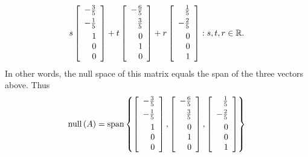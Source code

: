 \begin{solution}
\begin{equation*}
s \leftB 
\begin{array}{r}
-\vspace{0.05in}\frac{3}{5} \\ 
-\vspace{0.05in}\frac{1}{5} \\ 
1 \\ 
0 \\ 
0
\end{array}
\rightB + t \leftB 
\begin{array}{r}
-\vspace{0.05in}\frac{6}{5} \\ 
\vspace{0.05in}\frac{3}{5} \\ 
0 \\ 
1 \\ 
0
\end{array}
\rightB + r \leftB 
\begin{array}{r}
\vspace{0.05in}\frac{1}{5} \\ 
-\vspace{0.05in}\frac{2}{5} \\ 
0 \\ 
0 \\ 
1
\end{array}
\rightB :s , t , r\in \mathbb{R}\text{.}
\end{equation*}
In other words, the null space of this matrix equals the span of the three
vectors above. Thus 
\begin{equation*}
\func{null} \left( A\right) =\func{span}\left\{ \leftB 
\begin{array}{r}
-\vspace{0.05in}\frac{3}{5} \\ 
-\vspace{0.05in}\frac{1}{5} \\ 
1 \\ 
0 \\ 
0
\end{array}
\rightB ,\leftB 
\begin{array}{r}
-\vspace{0.05in}\frac{6}{5} \\ 
\vspace{0.05in}\frac{3}{5} \\ 
0 \\ 
1 \\ 
0
\end{array}
\rightB ,\leftB 
\begin{array}{r}
\vspace{0.05in}\frac{1}{5} \\ 
-\vspace{0.05in}\frac{2}{5} \\ 
0 \\ 
0 \\ 
1
\end{array}
\rightB \right\} 
\end{equation*}
\end{solution}

